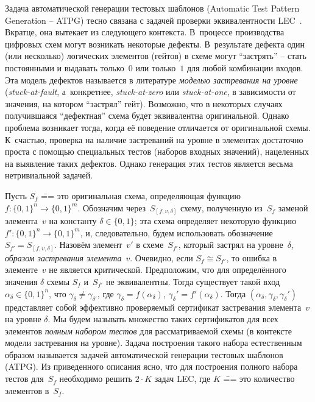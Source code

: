 Задача автоматической генерации тестовых шаблонов (Automatic Test Pattern Generation \--- ATPG) тесно связана с задачей проверки эквивалентности LEC~\cite{drechsler2021}.
Вкратце, она вытекает из следующего контекста.
В~процессе производства цифровых схем могут возникать некоторые дефекты.
В~результате дефекта один (или несколько) логических элементов (гейтов) в схеме могут \enquote{застрять} \--- стать постоянными и выдавать только~$0$ или только~$1$ для любой комбинации входов.
Эта модель дефектов называется в литературе \textit{моделью застревания на уровне} (\textit{stuck-at-fault}, а~конкретнее, \textit{stuck-at-zero} или \textit{stuck-at-one}, в зависимости от значения, на котором \enquote{застрял} гейт).
Возможно, что в некоторых случаях получившаяся \enquote{дефектная} схема будет эквивалентна оригинальной.
Однако проблема возникает тогда, когда её поведение отличается от оригинальной схемы.
К~счастью, проверка на наличие застреваний на уровне в элементах достаточно проста с помощью специальных тестов (наборов входных значений), нацеленных на выявление таких дефектов.
Однако генерация этих тестов является весьма нетривиальной задачей.

Пусть $S_f$ \=== это оригинальная схема, определяющая функцию $f \colon \{0,1\}^n \to \{0,1\}^m$.
Обозначим через~$S_{[f,v,\delta]}$ схему, полученную из~$S_f$ заменой элемента~$v$ на константу $\delta \in \{0,1\}$; эта схема определяет некоторую функцию $f' \colon \{0,1\}^n \to \{0,1\}^m$, и, следовательно, будем использовать обозначение $S_{f'} = S_{[f,v,\delta]}$.
Назовём элемент~$v'$ в схеме~$S_{f'}$, который застрял на уровне~$\delta$, \textit{образом застревания элемента}~$v$.
Очевидно, если $S_f \cong S_{f'}$, то ошибка в элементе~$v$ не является критической.
Предположим, что для определённого значения $\delta$ схемы $S_f$ и~$S_{f'}$ не эквивалентны.
Тогда существует такой вход $\alpha_\delta \in \{0,1\}^n$, что $\gamma_\delta \neq \gamma_{\delta'}$, где $\gamma_\delta = f(\alpha_\delta)$, $\gamma_\delta' = f'(\alpha_\delta)$.
Тогда $(\alpha_\delta, \gamma_\delta, \gamma_\delta')$ представляет собой эффективно проверяемый сертификат застревания элемента~$v$ на уровне $\delta$.
Мы будем называть множество таких сертификатов для всех элементов \textit{полным набором тестов} для рассматриваемой схемы (в контексте модели застревания на уровне).
Задача построения такого набора естественным образом называется задачей автоматической генерации тестовых шаблонов (ATPG).
Из приведенного описания ясно, что для построения полного набора тестов для~$S_f$ необходимо решить $2 \cdot K$ задач LEC, где $K$ \=== это количество элементов в~$S_f$.


